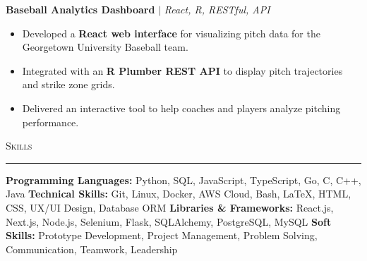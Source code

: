 \documentclass[11pt,letterpaper]{article}
\begin{document}
\begin{list}{}{\setlength{\leftmargin}{1em}\setlength{\rightmargin}{2pt}}
    \item
          \textbf{Baseball Analytics Dashboard} $|$ \small{\textit{React, R, RESTful, API}} \hfill \small{\textit{}}
          \begin{itemize}[itemsep=-5pt, topsep=-2pt]
              \item Developed a \textbf{React web interface} for visualizing pitch data for the Georgetown University Baseball team.
              \item Integrated with an \textbf{R Plumber REST API} to display pitch trajectories and strike zone grids.
              \item Delivered an interactive tool to help coaches and players analyze pitching performance.
          \end{itemize}
\end{list}



\vspace{4pt}
\textsc{\large{Skills}} 
\vspace{4pt}
\hrule
\begin{list}{}{\setlength{\leftmargin}{1em}\setlength{\rightmargin}{2pt}}
  
    \item
          \small{\textbf{Programming Languages:} Python, SQL, JavaScript, TypeScript, Go, C, C++, Java}
          \vspace{2pt} \newline
          \small{\textbf{Technical Skills:} Git, Linux, Docker, AWS Cloud, Bash, LaTeX, HTML, CSS, UX/UI Design, Database ORM}
          \vspace{2pt} \newline
          \small{\textbf{Libraries \& Frameworks:} React.js, Next.js, Node.js, Selenium, Flask, SQLAlchemy, PostgreSQL, MySQL}
          \vspace{2pt} \newline
          \small{\textbf{Soft Skills:} Prototype Development, Project Management, Problem Solving, Communication, Teamwork, Leadership}
          \vspace{0pt}
\end{list}
\end{document}
